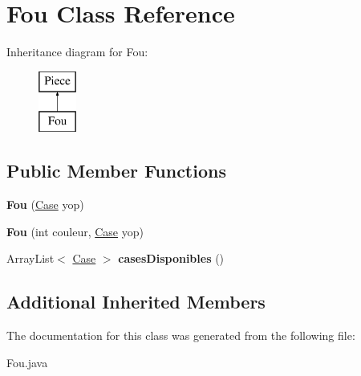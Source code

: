 \hypertarget{class_fou}{}\section{Fou Class Reference}
\label{class_fou}
Inheritance diagram for Fou\+:\begin{figure}[H]
\begin{center}
\leavevmode
\includegraphics[height=2.000000cm]{class_fou}
\end{center}
\end{figure}
\subsection*{Public Member Functions}
\begin{DoxyCompactItemize}
\item 
{\bfseries Fou} (\hyperlink{class_case}{Case} yop)\hypertarget{class_fou_a37d926b3270c1de7f82fae34c95b4277}{}\label{class_fou_a37d926b3270c1de7f82fae34c95b4277}

\item 
{\bfseries Fou} (int couleur, \hyperlink{class_case}{Case} yop)\hypertarget{class_fou_ac287e82db0fa269820953dfb6fd6a906}{}\label{class_fou_ac287e82db0fa269820953dfb6fd6a906}

\item 
Array\+List$<$ \hyperlink{class_case}{Case} $>$ {\bfseries cases\+Disponibles} ()\hypertarget{class_fou_a9c31eafd2fb1a30d9c36bbe4e6a4e35f}{}\label{class_fou_a9c31eafd2fb1a30d9c36bbe4e6a4e35f}

\end{DoxyCompactItemize}
\subsection*{Additional Inherited Members}


The documentation for this class was generated from the following file\+:\begin{DoxyCompactItemize}
\item 
Fou.\+java\end{DoxyCompactItemize}
